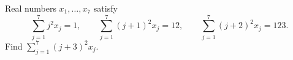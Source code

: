 Real numbers $x_1,\ldots,x_7$ satisfy
\[\sum_{j=1}^7j^2x_j=1,\qquad\sum_{j=1}^7(j+1)^2x_j=12,\qquad\sum_{j=1}^7(j+2)^2x_j=123.\]
Find $\sum_{j=1}^7(j+3)^2x_j$.
